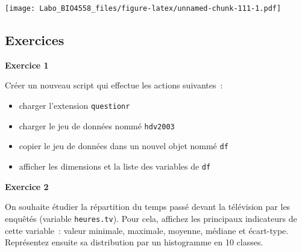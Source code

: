 \documentclass[12pt,]{book}
\newenvironment{Shaded}{\begin{snugshade}}{\end{snugshade}}
\newcommand{\KeywordTok}[1]{\textcolor[rgb]{0.27,0.27,0.27}{\textbf{#1}}}
\newcommand{\NormalTok}[1]{#1}
\newcommand{\OperatorTok}[1]{\textcolor[rgb]{0.43,0.43,0.43}{\textbf{#1}}}
\newcommand{\StringTok}[1]{\textcolor[rgb]{0.5,0.5,0.5}{#1}}
\providecommand{\tightlist}{%
  \setlength{\itemsep}{0pt}\setlength{\parskip}{0pt}}
\begin{document}
\begin{Shaded}
\end{Shaded}

\texttt{[image: Labo\_BIO4558\_files/figure-latex/unnamed-chunk-111-1.pdf]}

\hypertarget{ex-introR-univ}{%
\subsection{Exercices}\label{ex-introR-univ}}

\textbf{Exercice 1}

Créer un nouveau script qui effectue les actions suivantes~:

\begin{itemize}
\tightlist
\item
  charger l'extension \texttt{questionr}
\item
  charger le jeu de données nommé \texttt{hdv2003}
\item
  copier le jeu de données dans un nouvel objet nommé \texttt{df}
\item
  afficher les dimensions et la liste des variables de \texttt{df}
\end{itemize}

\textbf{Exercice 2}

On souhaite étudier la répartition du temps passé devant la télévision par les enquêtés (variable \texttt{heures.tv}). Pour cela, affichez les principaux indicateurs de cette variable~: valeur minimale, maximale, moyenne, médiane et écart-type. Représentez ensuite sa distribution par un histogramme en 10 classes.
\end{document}
